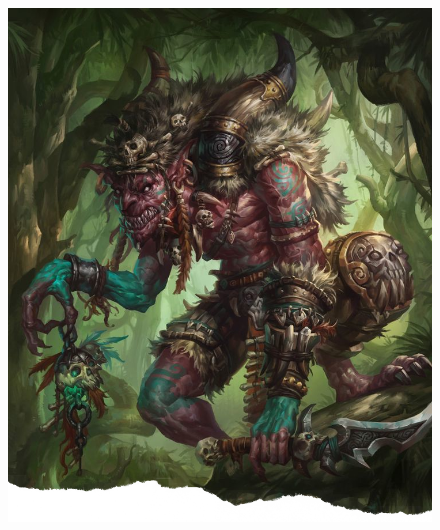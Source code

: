 \documentclass[10pt,twoside,twocolumn,openany]{dndbook}
\begin{document}
\begin{figure}[!t]
     \checkoddpage
     \vspace*{\the\dimexpr-1in-\voffset-\topmargin-\headheight-\headsep\relax}%
     \ifoddpage%
       \hspace*{\the\dimexpr-1in-\hoffset-\oddsidemargin\relax}%
     \else%
      \hspace*{\the\dimexpr-1in-\hoffset-\evensidemargin\relax}%
     \fi%
     \includegraphics[width=\paperwidth]{media/chaman-hobgoblin.png}
\end{figure}
\end{document}
